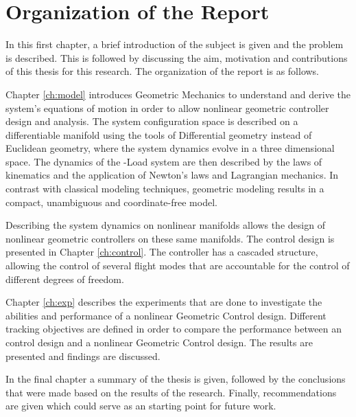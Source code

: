 \section{Organization of the Report}

In this first chapter, a brief introduction of the subject is given and the problem is described. This is followed by discussing the aim, motivation and contributions of this thesis for this research. The organization of the report is as follows.

Chapter \ref{ch:model} introduces Geometric Mechanics to understand and derive the system's equations of motion in order to allow nonlinear geometric controller design and analysis. 
The system configuration space is described on a differentiable manifold using the tools of Differential geometry instead of Euclidean geometry, where the system dynamics evolve in a three dimensional space.
The dynamics of the -Load system are then described by the laws of kinematics and the application of Newton's laws and Lagrangian mechanics. 
In contrast with classical modeling techniques, geometric modeling results in a compact, unambiguous and coordinate-free model.

Describing the system dynamics on nonlinear manifolds allows the design of nonlinear geometric controllers on these same manifolds. The control design is presented in Chapter \ref{ch:control}. The controller has a cascaded structure, allowing the control of several flight modes that are accountable for the control of different degrees of freedom.

Chapter \ref{ch:exp} describes the experiments that are done to investigate the abilities and performance of a nonlinear Geometric Control design. 
Different tracking objectives are defined in order to compare the performance between an  control design and a nonlinear Geometric Control design. The results are presented and findings are discussed.

In the final chapter a summary of the thesis is given, followed by the conclusions that were made based on the results of the research.
Finally, recommendations are given which could serve as an starting point for future work. 

